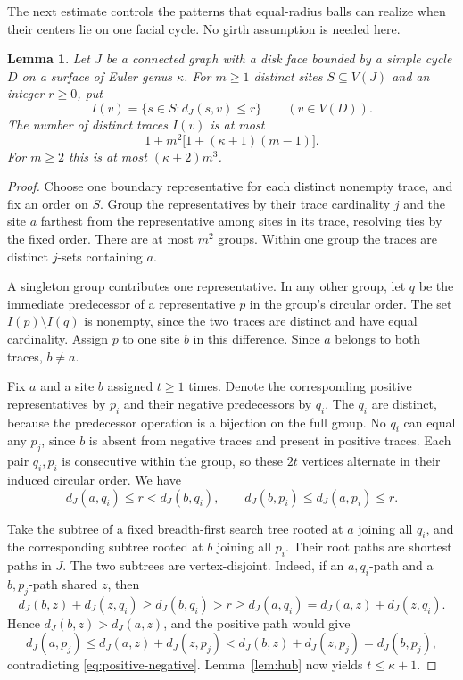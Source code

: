 \documentclass[11pt]{article}
\newtheorem{lemma}[theorem]{Lemma}
\theoremstyle{remark}
\begin{document}
The next estimate controls the patterns that equal-radius balls can realize
when their centers lie on one facial cycle. No girth assumption is needed here.

\begin{lemma}\label{lem:traces}
Let $J$ be a connected graph with a disk face bounded by a simple cycle $D$
on a surface of Euler genus $\kappa$. For $m\ge1$ distinct sites
$S\subseteq V(J)$ and an integer $r\ge0$, put
\[
I(v)=\{s\in S:d_J(s,v)\le r\}\qquad(v\in V(D)).
\]
The number of distinct traces $I(v)$ is at most
\begin{equation}\label{eq:traces}
1+m^2\bigl[1+(\kappa+1)(m-1)\bigr].
\end{equation}
For $m\ge2$ this is at most $(\kappa+2)m^3$.
\end{lemma}
\begin{proof}
Choose one boundary representative for each distinct nonempty trace, and
fix an order on $S$. Group the representatives by their trace cardinality
$j$ and the site $a$ farthest from the representative among sites in its
trace, resolving ties by the fixed order. There are at most $m^2$ groups.
Within one group the traces are distinct $j$-sets containing $a$.

A singleton group contributes one representative. In any other group, let
$q$ be the immediate predecessor of a representative $p$ in the group's
circular order. The set $I(p)\setminus I(q)$ is nonempty, since the two
traces are distinct and have equal cardinality. Assign $p$ to one site
$b$ in this difference. Since $a$ belongs to both traces, $b\ne a$.

Fix $a$ and a site $b$ assigned $t\ge1$ times. Denote the corresponding
positive representatives by $p_i$ and their negative predecessors by $q_i$.
The $q_i$ are distinct, because the predecessor operation is a bijection
on the full group. No $q_i$ can equal any $p_j$, since $b$ is absent from
negative traces and present in positive traces. Each pair $q_i,p_i$ is
consecutive within the group, so these $2t$ vertices alternate in their
induced circular order. We have
\begin{equation}\label{eq:positive-negative}
d_J(a,q_i)\le r<d_J(b,q_i),\qquad
d_J(b,p_i)\le d_J(a,p_i)\le r.
\end{equation}

Take the subtree of a fixed breadth-first search tree rooted at $a$
joining all $q_i$, and the corresponding subtree rooted at $b$ joining all
$p_i$. Their root paths are shortest paths in $J$. The two subtrees are
vertex-disjoint. Indeed, if an $a,q_i$-path and a $b,p_j$-path shared $z$,
then
\[
d_J(b,z)+d_J(z,q_i)\ge d_J(b,q_i)>r
 \ge d_J(a,q_i)=d_J(a,z)+d_J(z,q_i).
\]
Hence $d_J(b,z)>d_J(a,z)$, and the positive path would give
\[
d_J(a,p_j)\le d_J(a,z)+d_J(z,p_j)
 <d_J(b,z)+d_J(z,p_j)=d_J(b,p_j),
\]
contradicting \eqref{eq:positive-negative}.
Lemma~\ref{lem:hub} now yields $t\le\kappa+1$.


\end{proof}
\end{document}
